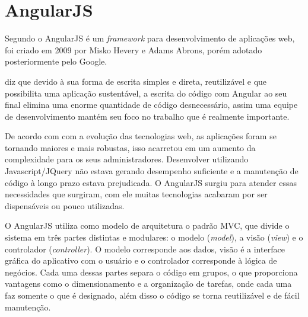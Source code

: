 \section{AngularJS}
	\par Segundo  o AngularJS é um \textit{framework} para desenvolvimento de aplicações web, foi criado em 2009 por Misko Hevery e Adams Abrons, porém adotado posteriormente pelo Google.
	\par {} diz que devido à sua forma de escrita simples e direta, reutilizável e que possibilita uma aplicação sustentável, a escrita do código com Angular ao seu final elimina uma enorme quantidade de código desnecessário, assim uma equipe de desenvolvimento mantém seu foco no trabalho que é realmente importante.
	\par De acordo com  com a evolução das tecnologias web, as aplicações foram se tornando maiores e mais robustas, isso acarretou em um aumento da complexidade para os seus administradores. Desenvolver utilizando Javascript/JQuery não estava gerando desempenho suficiente e a manutenção de código à longo prazo estava prejudicada. O AngularJS surgiu para atender essas necessidades que surgiram, com ele muitas tecnologias acabaram por ser dispensáveis ou pouco utilizadas.
	\par O AngularJS utiliza como modelo de arquitetura o padrão MVC, que divide o sistema em três partes distintas e modulares: o modelo (\textit{model}), a visão (\textit{view}) e o controlador (\textit{controller}). O modelo corresponde aos dados, visão é a interface gráfica do aplicativo com o usuário e o controlador corresponde à lógica de negócios. Cada uma dessas partes separa o código em grupos, o que proporciona vantagens como o dimensionamento e a organização de tarefas, onde cada uma faz somente o que é designado, além disso o código se torna reutilizável e de fácil manutenção. 
	




